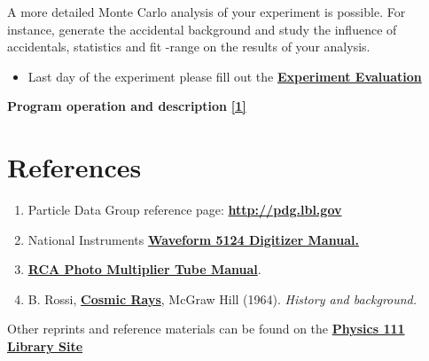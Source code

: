 \documentclass{../lab}
\begin{document}
A more detailed Monte Carlo analysis of your experiment is possible. For instance, generate the accidental background and study the influence of accidentals, statistics and fit -range on the results of your analysis.

\begin{itemize}
    \item Last day of the experiment please fill out the \href{\ExperimentEvaluation}{\textbf{Experiment Evaluation}}

\end{itemize}

\textbf{Program operation and description} \href{http://experimentationlab.berkeley.edu/node/88}{\textbf{[1]}}

\section{References}
\label{sec:References}

\begin{enumerate}
    \item Particle Data Group reference page: \href{http://pdg.lbl.gov}{\textbf{http://pdg.lbl.gov}}

    \item National Instruments \href{http://experimentationlab.berkeley.edu/sites/default/files/pdfs/Daq-5124.pdf}{\textbf{Waveform 5124 Digitizer Manual.}}

    \item \href{http://physics111.lib.berkeley.edu/Physics111/Equipment\_Manuals/RCA\_PMT.pdf}{\textbf{RCA Photo Multiplier Tube Manual}}.

    \item B. Rossi, \href{http://physics111.lib.berkeley.edu/Physics111/Reprints/MUO/02-Cosmic-Ray\_Phenomena.pdf}{\textbf{Cosmic Rays}}, McGraw Hill (1964). \emph{History and background.}

\end{enumerate}

\noindent Other reprints and reference materials can be found on the \href{http://physics111.lib.berkeley.edu/Physics111/Reprints/MUO/MUO\_index.html}{\textbf{Physics 111 Library Site}}
\end{document}
